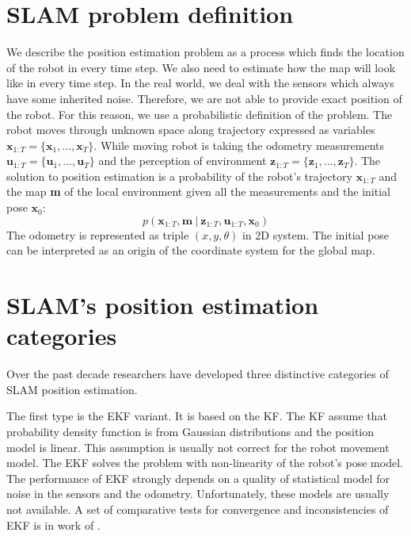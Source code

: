 \section{SLAM problem definition}
\label{sec:SLAM_def}
We describe the position estimation problem as a process which finds the location of the robot in every time step. We also need to estimate how the map will look like in every time step. In the real world, we deal with the sensors which always have some inherited noise. Therefore, we are not able to provide exact position of the robot. For this reason, we use a probabilistic definition of the problem. The robot moves through unknown space along trajectory expressed as variables $ \textbf{x}_{1:T} = \{\textbf{x}_{1},...,\textbf{x}_{T}\} $. While moving robot is taking the odometry measurements $ \textbf{u}_{1:T} = \{\textbf{u}_{1},...,\textbf{u}_{T}\}$ and the perception of environment $ \textbf{z}_{1:T} = \{\textbf{z}_{1},...,\textbf{z}_{T}\}$. The solution to position estimation is a probability of the robot's trajectory $ \textbf{x}_{1:T}$ and the map \textbf{m} of the local environment given all the measurements and the initial pose $ \textbf{x}_{0}$:
\begin{equation}
p(\textbf{x}_{1:T}, \textbf{m}\: |\:  \textbf{z}_{1:T}, \textbf{u}_{1:T}, \textbf{x}_{0})
\end{equation}
The odometry is represented as triple $(x,y,\theta)$ in 2D system. The initial pose can be interpreted as an origin of the coordinate system for the global map.

\section{SLAM's position estimation categories}
Over the past decade researchers have developed three distinctive categories of \gls{SLAM} position estimation. 

The first type is the \gls{EKF} variant. It is based on the \gls{KF}. The \gls{KF}  assume that probability density function is from Gaussian distributions and the position model is linear. This assumption is usually not correct for the robot movement model. The \gls{EKF} solves the problem with non-linearity of the robot's pose model. The performance of \gls{EKF} strongly depends on a quality of statistical model for noise in the sensors and the odometry. Unfortunately, these models are usually not available. A set of comparative tests for convergence and inconsistencies of \gls{EKF} is in work of \cite{EKF}.

